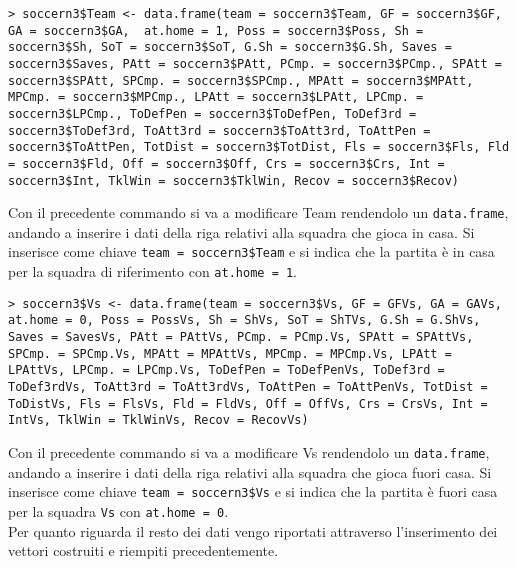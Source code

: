 \begin{lstlisting}
> soccern3$Team <- data.frame(team = soccern3$Team, GF = soccern3$GF, GA = soccern3$GA,  at.home = 1, Poss = soccern3$Poss, Sh = soccern3$Sh, SoT = soccern3$SoT, G.Sh = soccern3$G.Sh, Saves = soccern3$Saves, PAtt = soccern3$PAtt, PCmp. = soccern3$PCmp., SPAtt = soccern3$SPAtt, SPCmp. = soccern3$SPCmp., MPAtt = soccern3$MPAtt, MPCmp. = soccern3$MPCmp., LPAtt = soccern3$LPAtt, LPCmp. = soccern3$LPCmp., ToDefPen = soccern3$ToDefPen, ToDef3rd = soccern3$ToDef3rd, ToAtt3rd = soccern3$ToAtt3rd, ToAttPen = soccern3$ToAttPen, TotDist = soccern3$TotDist, Fls = soccern3$Fls, Fld = soccern3$Fld, Off = soccern3$Off, Crs = soccern3$Crs, Int = soccern3$Int, TklWin = soccern3$TklWin, Recov = soccern3$Recov)

\end{lstlisting}
Con il precedente commando si va a modificare \textsf{Team} rendendolo un \texttt{data.frame}, andando a inserire i dati della riga relativi alla squadra che gioca in casa. Si inserisce come chiave \texttt{team = soccern3\$Team} e si indica che la partita è in casa per la squadra di riferimento con \texttt{at.home = 1}.

\begin{lstlisting}
> soccern3$Vs <- data.frame(team = soccern3$Vs, GF = GFVs, GA = GAVs, at.home = 0, Poss = PossVs, Sh = ShVs, SoT = ShTVs, G.Sh = G.ShVs, Saves = SavesVs, PAtt = PAttVs, PCmp. = PCmp.Vs, SPAtt = SPAttVs, SPCmp. = SPCmp.Vs, MPAtt = MPAttVs, MPCmp. = MPCmp.Vs, LPAtt = LPAttVs, LPCmp. = LPCmp.Vs, ToDefPen = ToDefPenVs, ToDef3rd = ToDef3rdVs, ToAtt3rd = ToAtt3rdVs, ToAttPen = ToAttPenVs, TotDist = ToDistVs, Fls = FlsVs, Fld = FldVs, Off = OffVs, Crs = CrsVs, Int = IntVs, TklWin = TklWinVs, Recov = RecovVs)

\end{lstlisting}
Con il precedente commando si va a modificare \textsf{Vs} rendendolo un \texttt{data.frame}, andando a inserire i dati della riga relativi alla squadra che gioca fuori casa. Si inserisce come chiave \texttt{team = soccern3\$Vs} e si indica che la partita è fuori casa per la squadra \texttt{Vs} con \texttt{at.home = 0}.\\ Per quanto riguarda il resto dei dati vengo riportati attraverso l'inserimento dei vettori costruiti e riempiti precedentemente.
\newpage

